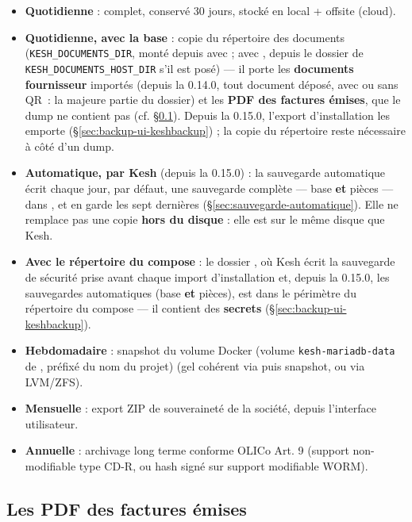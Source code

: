 \documentclass[a4paper,11pt,oneside]{article}
\begin{document}
\begin{itemize}
    \item \textbf{Quotidienne} :  complet, conservé 30 jours, stocké en local + offsite (cloud).
    \item \textbf{Quotidienne, avec la base} : copie du répertoire des documents (\texttt{KESH\_DOCUMENTS\_DIR}, monté depuis  avec  ; avec , depuis le dossier de \texttt{KESH\_DOCUMENTS\_HOST\_DIR} s'il est posé) --- il porte les \textbf{documents fournisseur} importés (depuis la 0.14.0, tout document déposé, avec ou sans QR~: la majeure partie du dossier) et les \textbf{PDF des factures émises}, que le dump ne contient pas (cf. \S\ref{sec:pdf-factures-sauvegarde}). Depuis la 0.15.0, l'export d'installation  les emporte (\S\ref{sec:backup-ui-keshbackup}) ; la copie du répertoire reste nécessaire à côté d'un dump.
    \item \textbf{Automatique, par Kesh} (depuis la 0.15.0) : la sauvegarde automatique écrit chaque jour, par défaut, une sauvegarde complète --- base \textbf{et} pièces --- dans , et en garde les sept dernières (\S\ref{sec:sauvegarde-automatique}). Elle ne remplace pas une copie \textbf{hors du disque} : elle est sur le même disque que Kesh.
    \item \textbf{Avec le répertoire du compose} : le dossier , où Kesh écrit la sauvegarde de sécurité prise avant chaque import d'installation et, depuis la 0.15.0, les sauvegardes automatiques (base \textbf{et} pièces), est dans le périmètre du répertoire du compose --- il contient des \textbf{secrets} (\S\ref{sec:backup-ui-keshbackup}).
    \item \textbf{Hebdomadaire} : snapshot du volume Docker  (volume \texttt{kesh-mariadb-data} de , préfixé du nom du projet) (gel cohérent via  puis snapshot, ou via LVM/ZFS).
    \item \textbf{Mensuelle} : export ZIP de souveraineté de la société, depuis l'interface utilisateur.
    \item \textbf{Annuelle} : archivage long terme conforme OLICo Art. 9 (support non-modifiable type CD-R, ou hash signé sur support modifiable WORM).
\end{itemize}

\subsection{Les PDF des factures émises}\label{sec:pdf-factures-sauvegarde}
\end{document}
